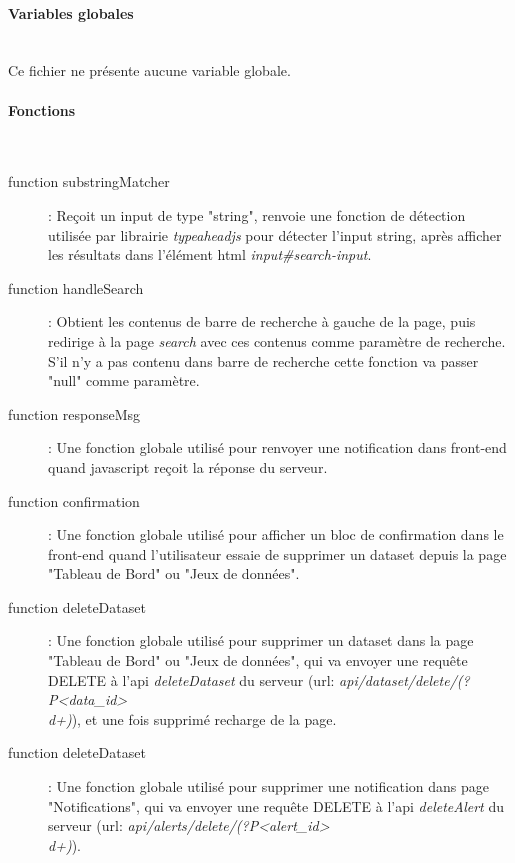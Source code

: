 \documentclass[a4paper]{report}
\begin{document}
\paragraph{Variables globales}~\\
Ce fichier ne présente aucune variable globale.

\paragraph{Fonctions}~\\
\begin{description}
	\item[function substringMatcher]: Reçoit un input de type "string", renvoie une fonction de détection utilisée par librairie \emph{typeaheadjs} pour détecter l'input string, après afficher les résultats dans l'élément html \emph{input\#search-input}.
	
	\item[function handleSearch]: Obtient les contenus de barre de recherche à gauche de la page, puis redirige à la page \emph{search} avec ces contenus comme paramètre de recherche. S'il n'y a pas contenu dans barre de recherche cette fonction va passer "null" comme paramètre.
	
	\item[function responseMsg]: Une fonction globale utilisé pour renvoyer une notification dans front-end quand javascript reçoit la réponse du serveur.
	
	\item[function confirmation]: Une fonction globale utilisé pour afficher un bloc de confirmation dans le front-end quand l'utilisateur essaie de supprimer un dataset depuis la page "Tableau de Bord" ou "Jeux de données".
	
	\item[function deleteDataset]: Une fonction globale utilisé pour supprimer un dataset dans la page "Tableau de Bord" ou "Jeux de données", qui va envoyer une requête DELETE à l'api \emph{deleteDataset} du serveur (url: \emph{api/dataset/delete/(?P<data\_id>\\d+)}), et une fois supprimé recharge de la page.
	
	\item[function deleteDataset]: Une fonction globale utilisé pour supprimer une notification dans page "Notifications", qui va envoyer une requête DELETE à l'api \emph{deleteAlert} du serveur (url: \emph{api/alerts/delete/(?P<alert\_id>\\d+)}).
\end{description}
\end{document}

